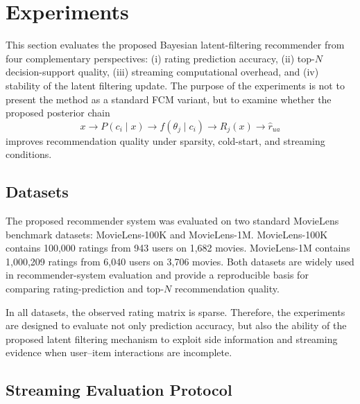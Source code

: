 \documentclass{article}
\theoremstyle{plain}
\theoremstyle{definition}
\theoremstyle{remark}
\begin{document}








\section{Experiments}
\label{sec:experiments}

This section evaluates the proposed Bayesian latent-filtering recommender from four complementary perspectives:
(i) rating prediction accuracy, (ii) top-\(N\) decision-support quality, (iii) streaming computational overhead, and (iv) stability of the latent filtering update. The purpose of the experiments is not to present the method as a standard FCM variant, but to examine whether the proposed posterior chain
\[
x
\longrightarrow
P(c_i\mid x)
\longrightarrow
f(\theta_j\mid c_i)
\longrightarrow
R_j(x)
\longrightarrow
\widehat r_{ua}
\]
improves recommendation quality under sparsity, cold-start, and streaming conditions.

\subsection{Datasets}
\label{subsec:datasets}

The proposed recommender system was evaluated on two standard MovieLens benchmark datasets: MovieLens-100K and MovieLens-1M. MovieLens-100K contains 100,000 ratings from 943 users on 1,682 movies. MovieLens-1M contains 1,000,209 ratings from 6,040 users on 3,706 movies. Both datasets are widely used in recommender-system evaluation and provide a reproducible basis for comparing rating-prediction and top-\(N\) recommendation quality.

In all datasets, the observed rating matrix is sparse. Therefore, the experiments are designed to evaluate not only prediction accuracy, but also the ability of the proposed latent filtering mechanism to exploit side information and streaming evidence when user--item interactions are incomplete.

\subsection{Streaming Evaluation Protocol}
\label{subsec:streaming_protocol}
\end{document}
